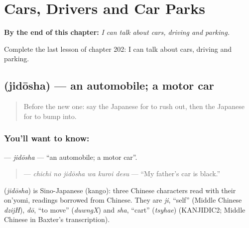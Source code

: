
\chapter{Cars, Drivers and Car Parks}
\label{ch:ja-cars-drivers-and-car-parks}

\begin{chapteropening}
\textbf{By the end of this chapter:} \emph{I can talk about cars, driving and parking.}

Complete the last lesson of chapter 202: I can talk about cars, driving and parking.
\end{chapteropening}

\section[\texorpdfstring{\ja{じどうしゃ} (jidōsha)}{じどうしゃ (jidōsha)}]{ (jidōsha) — an automobile; a motor car}

\label{lesson:JA-C202-jidousha}



\begin{quote}
Before the new one: say the Japanese for to rush out, then the Japanese for to bump into.
\end{quote}

\subsection*{You'll want to know: }
\textbf{} — \emph{jidōsha} — \textquotedblleft{}an automobile; a motor car\textquotedblright{}.

\begin{quote}
\textbf{  } — \emph{chichi no jidōsha wa kuroi desu} — \textquotedblleft{}My father's car is black.\textquotedblright{}
\end{quote}

\begin{cousinweb}
\textbf{} (\emph{jidōsha}) is Sino-Japanese (kango): three Chinese characters read with their on'yomi, readings borrowed from Chinese. They are \emph{ji}, \textquotedblleft{}self\textquotedblright{} (Middle Chinese \emph{dzijH}), \emph{dō}, \textquotedblleft{}to move\textquotedblright{} (\emph{duwngX}) and \emph{sha}, \textquotedblleft{}cart\textquotedblright{} (\emph{tsyhae}) (KANJIDIC2; Middle Chinese in Baxter's transcription).
\end{cousinweb}

